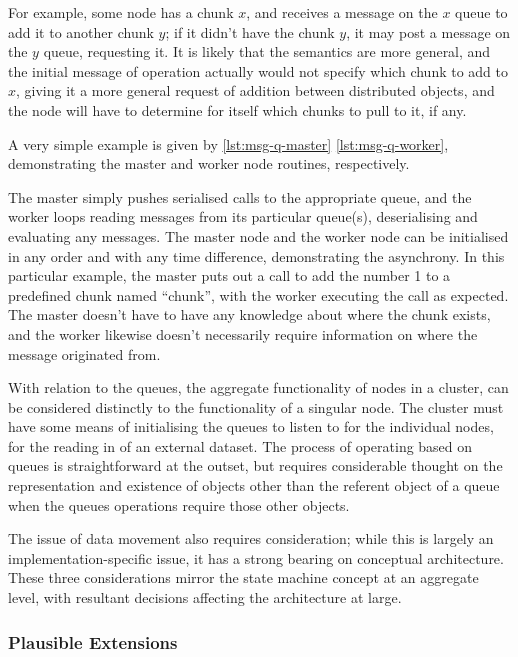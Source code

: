 For example, some node has a chunk \(x\), and receives a message on the \(x\) queue to add it to another chunk \(y\); if it didn't have the chunk \(y\), it may post a message on the \(y\) queue, requesting it.
It is likely that the semantics are more general, and the initial message of operation actually would not specify which chunk to add to \(x\), giving it a more general request of addition between distributed objects, and the node will have to determine for itself which chunks to pull to it, if any.

A very simple example is given by \cref{lst:msg-q-master} \cref{lst:msg-q-worker}, demonstrating the master and worker node routines, respectively.



The master simply pushes serialised calls to the appropriate queue, and the worker loops reading messages from its particular queue(s), deserialising and evaluating any messages.
The master node and the worker node can be initialised in any order and with any time difference, demonstrating the asynchrony.
In this particular example, the master puts out a call to add the number 1 to a predefined chunk named ``chunk'', with the worker executing the call as expected.
The master doesn't have to have any knowledge about where the chunk exists, and the worker likewise doesn't necessarily require information on where the message originated from.

With relation to the queues, the aggregate functionality of nodes in a cluster, can be considered distinctly to the functionality of a singular node.
The cluster must have some means of initialising the queues to listen to for the individual nodes, for the reading in of an external dataset.
The process of operating based on queues is straightforward at the outset, but requires considerable thought on the representation and existence of objects other than the referent object of a queue when the queues operations require those other objects.

The issue of data movement also requires consideration; while this is largely an implementation-specific issue, it has a strong bearing on conceptual architecture.
These three considerations mirror the state machine concept at an aggregate level, with resultant decisions affecting the architecture at large.

\subsubsection{Plausible Extensions}\label{plausible-extensions}

